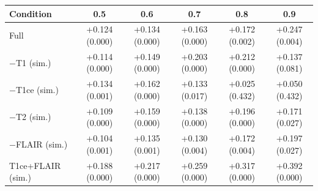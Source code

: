 \begin{tabular}{lccccc}
\toprule
Condition & 0.5 & 0.6 & 0.7 & 0.8 & 0.9 \\
\midrule
Full & +0.124 (0.000) & +0.134 (0.000) & +0.163 (0.000) & +0.172 (0.002) & +0.247 (0.004) \\
$-$T1 (sim.) & +0.114 (0.000) & +0.149 (0.000) & +0.203 (0.000) & +0.212 (0.000) & +0.137 (0.081) \\
$-$T1ce (sim.) & +0.134 (0.001) & +0.162 (0.000) & +0.133 (0.017) & +0.025 (0.432) & +0.050 (0.432) \\
$-$T2 (sim.) & +0.109 (0.000) & +0.159 (0.000) & +0.138 (0.000) & +0.196 (0.000) & +0.171 (0.027) \\
$-$FLAIR (sim.) & +0.104 (0.001) & +0.135 (0.001) & +0.130 (0.004) & +0.172 (0.004) & +0.197 (0.027) \\
T1ce+FLAIR (sim.) & +0.188 (0.000) & +0.217 (0.000) & +0.259 (0.000) & +0.317 (0.000) & +0.392 (0.000) \\
\bottomrule
\end{tabular}
